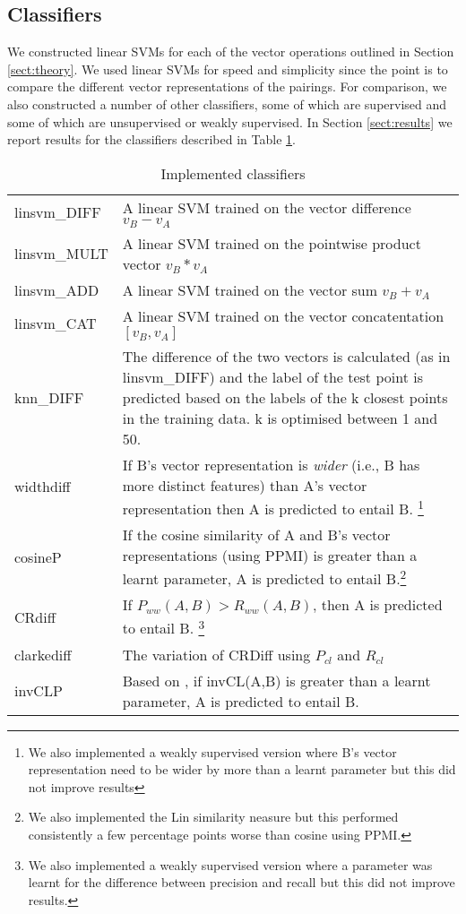 \documentclass[11pt]{article}
\begin{document}
\subsection{Classifiers}

We constructed linear SVMs for each of the vector operations outlined in Section \ref{sect:theory}.  We used linear SVMs for speed and simplicity since the point is to compare the different vector representations of the pairings.  For comparison, we also constructed a number of other classifiers, some of which are supervised and some of which are unsupervised or weakly supervised.  In Section \ref{sect:results} we report results for the classifiers described in Table \ref{table:classifiers}.

\begin{table}[ht]
\centering
\begin{tabular}{p{2cm} p{5.5cm}}
linsvm\_DIFF&A linear SVM trained on the vector difference $v_B - v_A$\\
linsvm\_MULT&A linear SVM trained on the pointwise product vector $v_B * v_A$\\
linsvm\_ADD&A linear SVM trained on the vector sum $v_B + v_A$\\
linsvm\_CAT&A linear SVM trained on the vector concatentation $[v_B,v_A]$\\
knn\_DIFF&The difference of the two vectors is calculated (as in linsvm\_DIFF) and the label of the test point is predicted based on the labels of the k closest points in the training data. k is optimised between 1 and 50.\\
widthdiff&If B's vector representation is \textit{wider} (i.e., B has more distinct features) than A's vector representation then A is predicted to entail B. \footnote{We also implemented a weakly supervised version where B's vector representation need to be wider by more than a learnt parameter but this did not improve results}\\
cosineP&If the cosine similarity of A and B's vector representations (using PPMI) is greater than a learnt parameter, A is predicted to entail B.\footnote{We also implemented the Lin similarity neasure \cite{Lin1998} but this performed consistently a few percentage points worse than cosine using PPMI.} \\
CRdiff&If $P_{ww}(A,B) > R_{ww}(A,B)$, then A is predicted to entail B.  \footnote{We also implemented a weakly supervised version where a parameter was learnt for the difference between precision and recall but this did not improve results.}\\
clarkediff&The \cite{Clarke2007} variation of CRDiff using $P_{cl}$ and $R_{cl}$\\
invCLP&Based on \cite{Lenci2012}, if invCL(A,B) is greater than a learnt parameter, A is predicted to entail B.\\
\end{tabular}
\caption{Implemented classifiers}
\label{table:classifiers}
\end{table}
\end{document}
